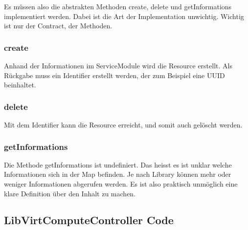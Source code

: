 Es müssen also die abstrakten Methoden create, delete und getInformations implementiert werden. 
Dabei ist die Art der Implementation unwichtig. 
Wichtig ist nur der Contract, der Methoden.

\subsubsection{create}
Anhand der Informationen im ServiceModule wird die Resource erstellt. Als Rückgabe muss ein Identifier erstellt werden, der zum Beispiel eine UUID beinhaltet.

\subsubsection{delete}
Mit dem Identifier kann die Resource erreicht, und somit auch gelöscht werden.

\subsubsection{getInformations}
Die Methode getInformations ist undefiniert. Das heisst es ist unklar welche Informationen sich in der Map befinden. Je nach Library können mehr oder weniger Informationen abgerufen werden. 
Es ist also praktisch unmöglich eine klare Definition über den Inhalt zu machen.

\subsection{LibVirtComputeController Code}

